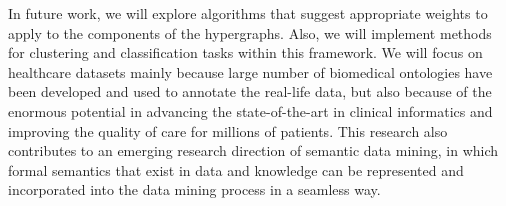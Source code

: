 In future work, we will explore algorithms that suggest appropriate weights to apply to the components of the hypergraphs. Also, we will implement methods for clustering and classification tasks within this framework. We will focus on healthcare datasets mainly because large number of biomedical ontologies have been developed and used to annotate the real-life data, but also because of the enormous potential in advancing the state-of-the-art in clinical informatics and improving the quality of care for millions of patients. This research also contributes to an emerging research direction of semantic data mining, in which formal semantics that exist in data and knowledge can be represented and incorporated into the data mining process in a seamless way.



